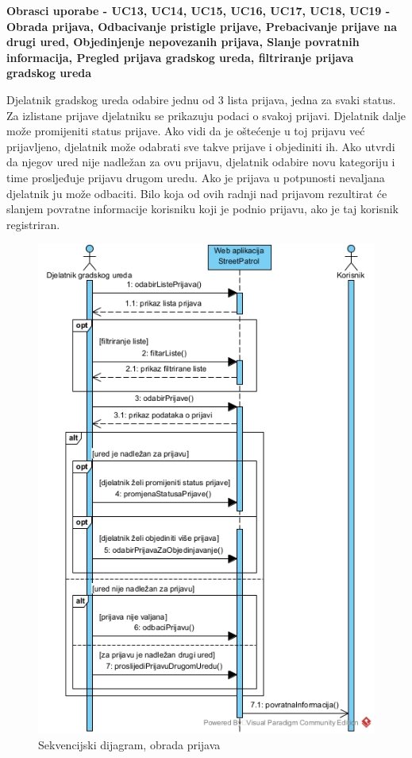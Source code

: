 				\textbf{Obrasci uporabe - UC13, UC14, UC15, UC16, UC17, UC18, UC19 - Obrada prijava, Odbacivanje pristigle prijave, Prebacivanje prijave na drugi ured, Objedinjenje nepovezanih prijava, Slanje povratnih informacija, Pregled prijava gradskog ureda, filtriranje prijava gradskog ureda}
				
				Djelatnik gradskog ureda odabire jednu od 3 lista prijava, jedna za svaki status. Za izlistane prijave djelatniku se prikazuju podaci o svakoj prijavi. Djelatnik dalje može promijeniti status prijave. Ako vidi da je oštećenje u toj prijavu već prijavljeno, djelatnik može odabrati sve takve prijave i objediniti ih. Ako utvrdi da njegov ured nije nadležan za ovu prijavu, djelatnik odabire novu kategoriju i time prosljeđuje prijavu drugom uredu. Ako je prijava u potpunosti nevaljana djelatnik ju može odbaciti. Bilo koja od ovih radnji nad prijavom rezultirat će slanjem povratne informacije korisniku koji je podnio prijavu, ako je taj korisnik registriran.
				
				\begin{figure}[H]
					\includegraphics[width=\textwidth]{slike/Obrada_prijavaSD.jpg} %
					\caption{Sekvencijski dijagram, obrada prijava}
					\label{fig:sekvencijskiDijagram3} %
				\end{figure}
				\eject


